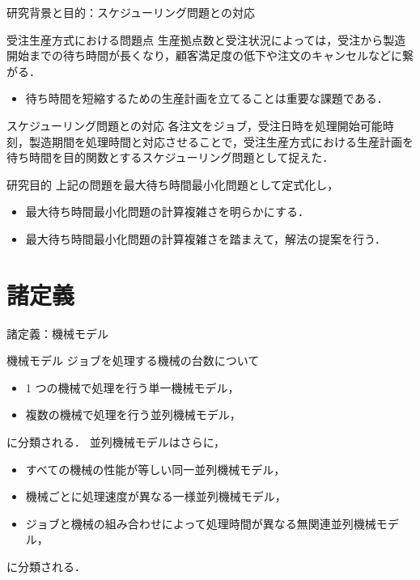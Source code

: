 \documentclass[dvipdfmx]{beamer}
\begin{document}
    \begin{frame}{研究背景と目的：スケジューリング問題との対応}
      \begin{block}{受注生産方式における問題点}
        生産拠点数と受注状況によっては，受注から製造開始までの\alert{待ち時間}が長くなり，顧客満足度の低下や注文のキャンセルなどに繋がる．
      \end{block}
      \begin{itemize}
        \setlength{\leftskip}{-5mm}
        \item 待ち時間を短縮するための生産計画を立てることは重要な課題である．
      \end{itemize}

      \begin{block}{スケジューリング問題との対応}
        各注文を\alert{ジョブ}，受注日時を\alert{処理開始可能時刻}，製造期間を\alert{処理時間}と対応させることで，受注生産方式における生産計画を\alert{待ち時間}を目的関数とするスケジューリング問題として捉えた．
      \end{block}

      \begin{block}{研究目的}
        上記の問題を\alert{最大待ち時間最小化問題}として定式化し，
        \begin{itemize}
          \setlength{\leftskip}{-2mm}
          \item 最大待ち時間最小化問題の計算複雑さを明らかにする．
          \item 最大待ち時間最小化問題の計算複雑さを踏まえて，解法の提案を行う．
        \end{itemize}
      \end{block}

    \end{frame}
    \section{諸定義}
    \begin{frame}{諸定義：機械モデル}
      \begin{block}{機械モデル}
        ジョブを処理する機械の台数について
        \begin{itemize}
          \item 1 つの機械で処理を行う\alert{単一機械モデル}，
          \item 複数の機械で処理を行う\alert{並列機械モデル}，
        \end{itemize}
        に分類される．
        並列機械モデルはさらに，
        \begin{itemize}
          \item すべての機械の性能が等しい\alert{同一並列機械モデル}，
          \item 機械ごとに処理速度が異なる\alert{一様並列機械モデル}，
          \item ジョブと機械の組み合わせによって処理時間が異なる\alert{無関連並列機械モデル}，
        \end{itemize}
        に分類される．
      \end{block}
    \end{frame}
\end{document}
